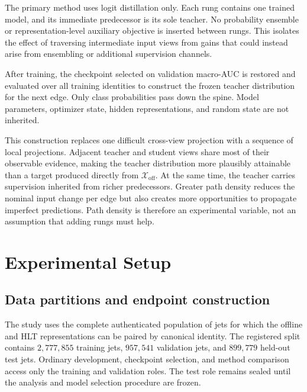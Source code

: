 \documentclass[11pt]{article}
\newcommand{\xoff}{\mathcal{X}_{\mathrm{off}}}
\begin{document}
The primary method uses logit distillation only.  Each rung contains one
trained model, and its immediate predecessor is its sole teacher.  No
probability ensemble or representation-level auxiliary objective is inserted
between rungs.  This isolates the effect of traversing intermediate input
views from gains that could instead arise from ensembling or additional
supervision channels.

After training, the checkpoint selected on validation macro-AUC is restored
and evaluated over all training identities to construct the frozen teacher
distribution for the next edge.  Only class probabilities pass down the
spine.  Model parameters, optimizer state, hidden representations, and random
state are not inherited.

This construction replaces one difficult cross-view projection with a
sequence of local projections.  Adjacent teacher and student views share most
of their observable evidence, making the teacher distribution more plausibly
attainable than a target produced directly from $\xoff$.  At the same time,
the teacher carries supervision inherited from richer predecessors.  Greater
path density reduces the nominal input change per edge but also creates more
opportunities to propagate imperfect predictions.  Path density is therefore
an experimental variable, not an assumption that adding rungs must help.

\section{Experimental Setup}
\label{sec:experiments}

\subsection{Data partitions and endpoint construction}

The study uses the complete authenticated population of jets for which the
offline and HLT representations can be paired by canonical identity.  The
registered split contains $2{,}777{,}855$ training jets, $957{,}541$
validation jets, and $899{,}779$ held-out test jets.  Ordinary development,
checkpoint selection, and method comparison access only the training and
validation roles.  The test role remains sealed until the analysis and model
selection procedure are frozen.

\end{document}
